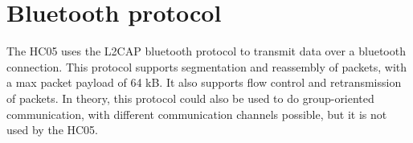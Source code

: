 \documentclass[11pt]{article}
\begin{document}
\section{Bluetooth protocol}
The HC05 uses the L2CAP bluetooth protocol to transmit data over a bluetooth connection. This protocol supports segmentation and reassembly of packets, with a max packet payload of 64 kB. It also supports flow control and retransmission of packets. In theory, this protocol could also be used to do group-oriented communication, with different communication channels possible, but it is not used by the HC05.

\newpage
\begin{appendices}




\end{appendices}
\end{document}
